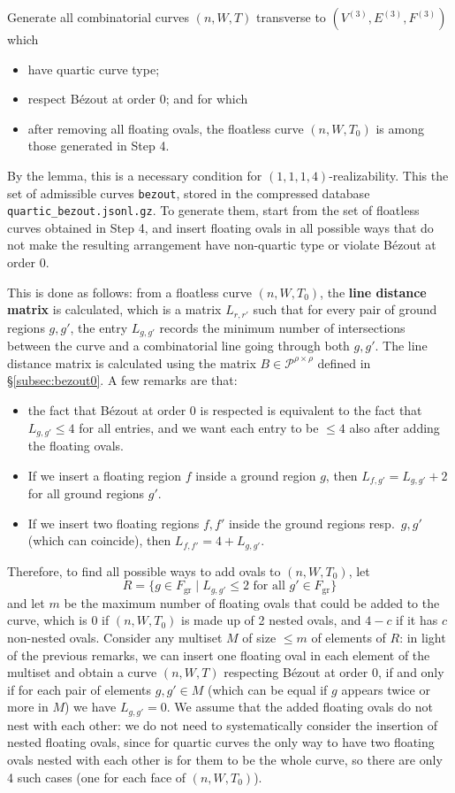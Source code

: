 \documentclass[11pt,reqno]{amsart}
\theoremstyle{plain}
\theoremstyle{definition}
\theoremstyle{remark}
\numberwithin{equation}{subsection}
\newcommand*{\calP}{\mathcal{P}}
\DeclareMathOperator{\gr}{gr}
\begin{document}
Generate all combinatorial curves $(n,W,T)$ transverse to $(V^{(3)},E^{(3)},F^{(3)})$ which
\begin{itemize}
    \item have quartic curve type;
    \item respect Bézout at order 0; and for which
    \item after removing all floating ovals, the floatless curve $(n,W,T_0)$ is among those generated in Step 4.
\end{itemize}
By the lemma, this is a necessary condition for $(1,1,1,4)$-realizability. This the set of admissible curves \texttt{bezout}, stored in the compressed database \texttt{quartic\_bezout.jsonl.gz}. To generate them, start from the set of floatless curves obtained in Step 4, and insert floating ovals in all possible ways that do not make the resulting arrangement have non-quartic type or violate Bézout at order 0.

This is done as follows: from a floatless curve $(n,W,T_0)$, the \textbf{line distance matrix} is calculated, which is a matrix $L_{r,r'}$ such that for every pair of ground regions $g,g'$, the entry $L_{g,g'}$ records the minimum number of intersections between the curve and a combinatorial line going through both $g,g'$. The line distance matrix is calculated using the matrix $B\in\calP^{\rho\times\rho}$ defined in §\ref{subsec:bezout0}. A few remarks are that:
    \begin{itemize}
        \item the fact that Bézout at order 0 is respected is equivalent to the fact that $L_{g,g'}\le4$ for all entries, and we want each entry to be $\le4$ also after adding the floating ovals.
        \item If we insert a floating region $f$ inside a ground region $g$, then $L_{f,g'}=L_{g,g'}+2$ for all ground regions $g'$.
        \item If we insert two floating regions $f,f'$ inside the ground regions resp.\ $g,g'$ (which can coincide), then $L_{f,f'}=4+L_{g,g'}$.
    \end{itemize}
    Therefore, to find all possible ways to add ovals to $(n,W,T_0)$, let
    \[R=\{g\in F_{\gr}\mid L_{g,g'}\le2\text{ for all $g'\in F_{\gr}$}\}\]
    and let $m$ be the maximum number of floating ovals that could be added to the curve, which is 0 if $(n,W,T_0)$ is made up of 2 nested ovals, and $4-c$ if it has $c$ non-nested ovals. Consider any multiset $M$ of size $\le m$ of elements of $R$: in light of the previous remarks, we can insert one floating oval in each element of the multiset and obtain a curve $(n,W,T)$ respecting Bézout at order 0, if and only if for each pair of elements $g,g'\in M$ (which can be equal if $g$ appears twice or more in $M$) we have $L_{g,g'}=0$. We assume that the added floating ovals do not nest with each other: we do not need to systematically consider the insertion of nested floating ovals, since for quartic curves the only way to have two floating ovals nested with each other is for them to be the whole curve, so there are only 4 such cases (one for each face of $(n,W,T_0)$).
\end{document}
